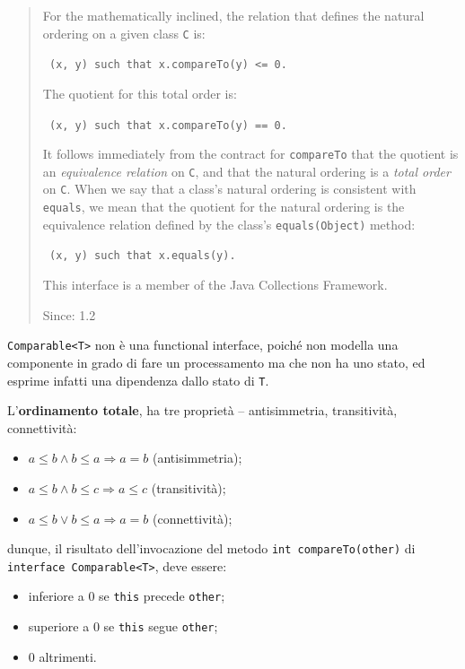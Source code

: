 \documentclass[\fontsizeclass,twocolumn]{\classname}
\theoremstyle{definition}
\theoremstyle{definition}
\begin{document}
\begin{quote}
{    For the mathematically inclined, the relation that defines the natural ordering on a given class \texttt{C} is:

\texttt{     (x, y) such that x.compareTo(y) <= 0.}
 
The quotient for this total order is:

\texttt{     (x, y) such that x.compareTo(y) == 0.}
 
    It follows immediately from the contract for \texttt{compareTo} that the quotient is an \emph{equivalence relation} on \texttt{C}, and that the natural ordering is a \emph{total order} on \texttt{C}. When we say that a class's natural ordering is consistent with \texttt{equals}, we mean that the quotient for the natural ordering is the equivalence relation defined by the class's \texttt{equals(Object)} method:

\texttt{     (x, y) such that x.equals(y).}

This interface is a member of the Java Collections Framework.

Since:
1.2
}
\end{quote}

\texttt{Comparable<T>} non è una functional interface, poiché non modella una
componente in grado di fare un processamento ma che non ha uno stato, ed
esprime infatti una dipendenza dallo stato di \texttt{T}.

L'\textbf{ordinamento totale}, ha tre proprietà -- antisimmetria, transitività,
connettività:

\begin{itemize}
    \item $a \leq b \wedge b \leq a \Rightarrow a = b$ (antisimmetria);
    \item $a \leq b \wedge b \leq c \Rightarrow a \leq c$ (transitività);
    \item $a \leq b \vee b \leq a \Rightarrow a = b$ (connettività);
\end{itemize}

dunque, il risultato dell'invocazione del metodo \texttt{int compareTo(other)} di \texttt{interface Comparable<T>}, deve essere:
\begin{itemize}
    \item inferiore a 0 se \texttt{this} precede \texttt{other};
    \item superiore a 0 se \texttt{this} segue \texttt{other};
    \item 0 altrimenti.
\end{itemize}
\end{document}
